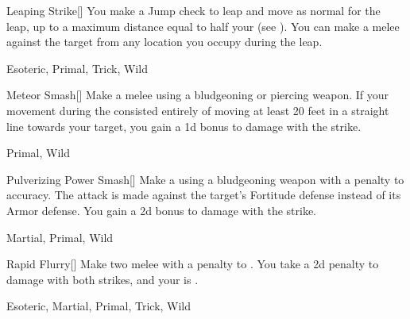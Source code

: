 \lowercase{\hypertarget{maneuver:Leaping Strike}{}}\label{maneuver:Leaping Strike}
\hypertarget{maneuver:Leaping Strike}{}
\begin{freeability}[Rank 3]{Leaping Strike}[]
You make a Jump check to leap and move as normal for the leap, up to a maximum distance equal to half your  (see ).
You can make a melee  against the target from any location you occupy during the leap.


 Esoteric, Primal, Trick, Wild
\end{freeability}
\vspace{0.25em}



\lowercase{\hypertarget{maneuver:Meteor Smash}{}}\label{maneuver:Meteor Smash}
\hypertarget{maneuver:Meteor Smash}{}
\begin{freeability}[Rank 3]{Meteor Smash}[]
Make a melee  using a bludgeoning or piercing weapon.
If your movement during the  consisted entirely of moving at least 20 feet in a straight line towards your target, you gain a \plus1d bonus to damage with the strike.


 Primal, Wild
\end{freeability}
\vspace{0.25em}



\lowercase{\hypertarget{maneuver:Pulverizing Power Smash}{}}\label{maneuver:Pulverizing Power Smash}
\hypertarget{maneuver:Pulverizing Power Smash}{}
\begin{freeability}[Rank 3]{Pulverizing Power Smash}[]
Make a  using a bludgeoning weapon with a  penalty to accuracy.
The attack is made against the target's Fortitude defense instead of its Armor defense.
You gain a \plus2d bonus to damage with the strike.


 Martial, Primal, Wild
\end{freeability}
\vspace{0.25em}



\lowercase{\hypertarget{maneuver:Rapid Flurry}{}}\label{maneuver:Rapid Flurry}
\hypertarget{maneuver:Rapid Flurry}{}
\begin{freeability}[Rank 3]{Rapid Flurry}[]
Make two melee  with a  penalty to .
You take a \minus2d penalty to damage with both strikes, and your  is .


 Esoteric, Martial, Primal, Trick, Wild
\end{freeability}
\vspace{0.25em}



